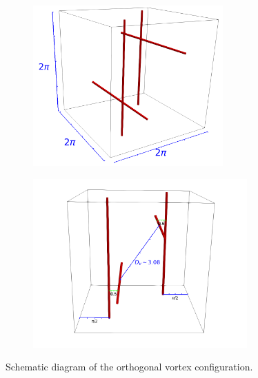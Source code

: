 \documentclass[%
superscriptaddress,
 amsmath,amssymb,
prl,
prb,
]{revtex4-2}
\begin{document}
\begin{figure}
	\centering
	\begin{subfigure}[b]{0.49\textwidth}
		\centering
		\includegraphics[width=0.8\textwidth]{schematic.png}
	\end{subfigure}
	\begin{subfigure}[b]{0.49\textwidth}
		\centering
		\includegraphics[width=0.9\textwidth]{schematic-2.png}
	\end{subfigure}
	\caption{Schematic diagram of the orthogonal vortex configuration.}
	\label{fig:schematic}
\end{figure}
\end{document}
